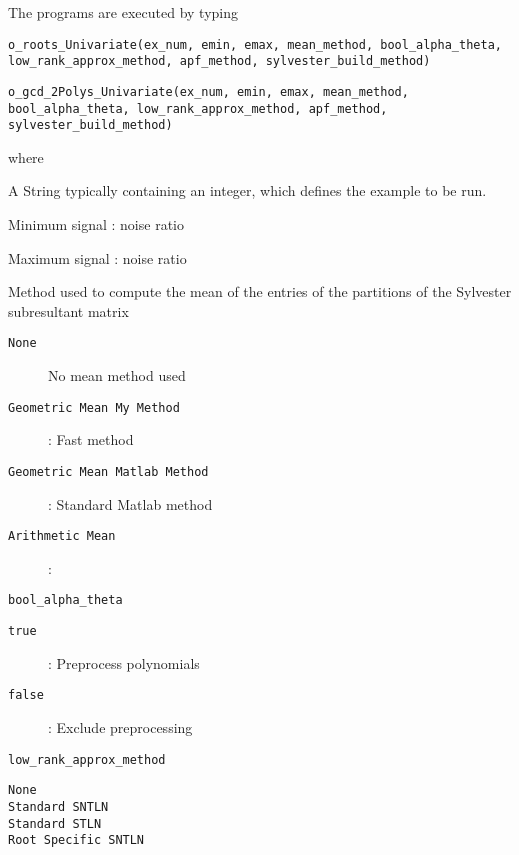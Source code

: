 \documentclass[a4paper,11pt]{article}
\begin{document}
The programs are executed by typing
%
%
\begin{center}
\texttt{o\_roots\_Univariate(ex\_num, emin, emax, mean\_method, bool\_alpha\_theta, low\_rank\_approx\_method, apf\_method, sylvester\_build\_method)}

\texttt{o\_gcd\_2Polys\_Univariate(ex\_num, emin, emax, mean\_method, bool\_alpha\_theta, low\_rank\_approx\_method, apf\_method, sylvester\_build\_method)}
\end{center}
%
 where
%
\begin{description}

	\item[\texttt{ex\_num}]
	A String typically containing an integer, which defines the example to be run.
	
	\item[\texttt{emin}] Minimum signal : noise ratio
	
	\item[\texttt{emax}] Maximum signal : noise ratio
	
	\item[\texttt{mean\_method}]
	Method used to compute the mean of the entries of the partitions of the Sylvester subresultant matrix
		\begin{description}
			\item[\texttt{None}] No mean method used
			\item[\texttt{Geometric Mean My Method}] : Fast method 
			\item[\texttt{Geometric Mean Matlab Method}] : Standard Matlab method
			\item[\texttt{Arithmetic Mean}] : 
		\end{description} 

	
	\item 
	\texttt{bool\_alpha\_theta} 
		\begin{description}
			\item[\texttt{true}] : Preprocess polynomials
			\item[\texttt{false}] : Exclude preprocessing 
		\end{description}


	
	\item 
	\texttt{low\_rank\_approx\_method}
		\begin{description}
			\item[\texttt{None}] 
			\item[\texttt{Standard SNTLN}] 
			\item[\texttt{Standard STLN}]
			\item[\texttt{Root Specific SNTLN}] 
		\end{description}
	

\end{description}
\end{document}
